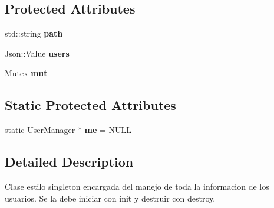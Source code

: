 \subsection*{Protected Attributes}
\begin{DoxyCompactItemize}
\item 
\hypertarget{classUserManager_adcd1cf9ee71d16fbeadd6cb7c9a04656}{std\-::string {\bfseries path}}\label{classUserManager_adcd1cf9ee71d16fbeadd6cb7c9a04656}

\item 
\hypertarget{classUserManager_aa996769bd40f6d2d0c3a88cc3f69f422}{Json\-::\-Value {\bfseries users}}\label{classUserManager_aa996769bd40f6d2d0c3a88cc3f69f422}

\item 
\hypertarget{classUserManager_ae251a67890e92d82c4d6bc9b26cd6cfd}{\hyperlink{classMutex}{Mutex} {\bfseries mut}}\label{classUserManager_ae251a67890e92d82c4d6bc9b26cd6cfd}

\end{DoxyCompactItemize}
\subsection*{Static Protected Attributes}
\begin{DoxyCompactItemize}
\item 
\hypertarget{classUserManager_acae4ad483ab485ac3747da2a2f3f9e45}{static \hyperlink{classUserManager}{User\-Manager} $\ast$ {\bfseries me} = N\-U\-L\-L}\label{classUserManager_acae4ad483ab485ac3747da2a2f3f9e45}

\end{DoxyCompactItemize}


\subsection{Detailed Description}
Clase estilo singleton encargada del manejo de toda la informacion de los usuarios. Se la debe iniciar con init y destruir con destroy. 

